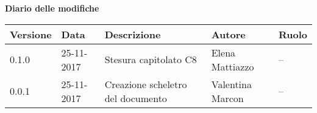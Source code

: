 \documentclass[main.tex]{subfiles}
\begin{document}
\huge \bfseries Diario delle modifiche\\
\begin{table}[htbp]
	\centering
	\renewcommand\arraystretch{1.2}

	\begin{tabularx}{\textwidth}{p{2cm}|p{2cm}|p{3cm}|p{2cm}|p{3cm}}
		\hline
		\textbf{Versione} & \textbf{Data} & \textbf{Descrizione} & \textbf{Autore} & \textbf{Ruolo}\\
		\hline
		0.1.0 & 25-11-2017 & Stesura capitolato C8 & Elena Mattiazzo & -- \\
		\hline
		0.0.1 & 25-11-2017 & Creazione scheletro del documento & Valentina Marcon & -- \\
		\hline
	
	\end{tabularx}

\end{table}
\end{document}
